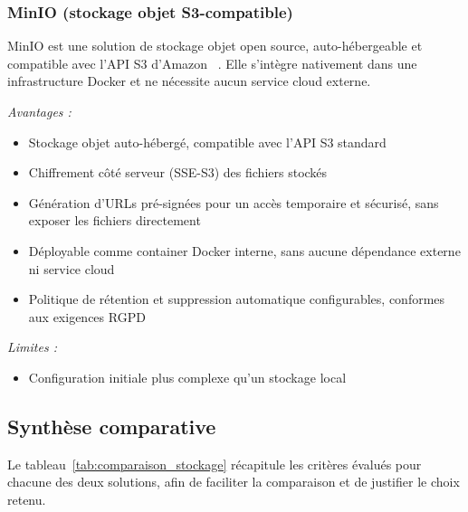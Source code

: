 \subsubsection{MinIO (stockage objet S3-compatible)}

MinIO est une solution de stockage objet open source, auto-hébergeable
et compatible avec l'API S3 d'Amazon ~\cite{minio_dev}. Elle s'intègre
nativement dans une infrastructure Docker et ne nécessite aucun service
cloud externe.

\textit{Avantages :}
\begin{itemize}
  \item Stockage objet auto-hébergé, compatible avec l'API S3 standard
  \item Chiffrement côté serveur (SSE-S3) des fichiers stockés
  \item Génération d'URLs pré-signées pour un accès temporaire
        et sécurisé, sans exposer les fichiers directement
  \item Déployable comme container Docker interne,
        sans aucune dépendance externe ni service cloud
  \item Politique de rétention et suppression automatique configurables,
        conformes aux exigences RGPD
\end{itemize}

\textit{Limites :}
\begin{itemize}
  \item Configuration initiale plus complexe qu'un stockage local
\end{itemize}

\subsection{Synthèse comparative}

Le tableau~\ref{tab:comparaison_stockage} récapitule les critères évalués pour chacune des deux
solutions, afin de faciliter la comparaison et de justifier le choix retenu.

